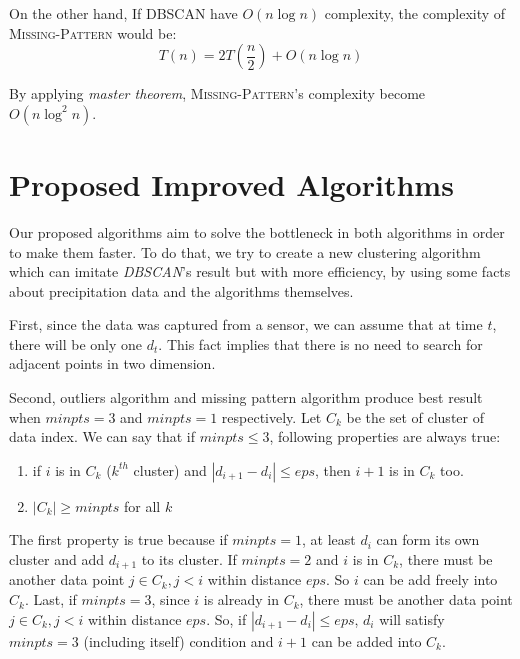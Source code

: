 \documentclass[conference]{IEEEtran}
\begin{document}
On the other hand, If \textsc{DBSCAN} have $O(n \log{n})$ complexity, the complexity of \textsc{Missing-Pattern} would be:
\[
T(n) = 2T(\frac{n}{2}) + O(n \log{n})
\]

By applying \textit{master theorem}, \textsc{Missing-Pattern}'s complexity become $O(n \log^2{n})$.


\section{Proposed Improved Algorithms}
Our proposed algorithms aim to solve the bottleneck in both algorithms in order to make them faster. To do that, we try to create a new clustering algorithm which can imitate \textit{DBSCAN}'s result but with more efficiency, by using some facts about precipitation data and the algorithms themselves.

First, since the data was captured from a sensor, we can assume that at time $t$, there will be only one $d_{t}$. This fact implies that there is no need to search for adjacent points in two dimension.

Second, outliers algorithm and missing pattern algorithm produce best result when $\textit{minpts} = 3$ and $\textit{minpts} = 1$ respectively. Let $C_{k}$ be the set of cluster of data index. We can say that if $\textit{minpts} \le 3$, following properties are always true:
\begin{enumerate}
	\item if $i$ is in $C_{k}$ (\textit{$k^{th}$} cluster) and $|d_{i+1} - d_{i}| \le \textit{eps}$, then $i+1$ is in $C_{k}$ too.
	\item $|C_{k}| \ge \textit{minpts}$ for all $k$ 
\end{enumerate}

The first property is true because if $\textit{minpts} = 1$, at least $d_{i}$ can form its own cluster and add $d_{i+1}$ to its cluster. If $\textit{minpts} = 2$ and $i$ is in $C_{k}$, there must be another data point $j \in C_{k}, j < i$ within distance $\textit{eps}$. So $i$ can be add freely into $C_{k}$. Last, if $\textit{minpts} = 3$, since $i$ is already in $C_{k}$, there must be another data point $j \in C_{k}, j < i$ within distance $\textit{eps}$. So, if $|d_{i+1} - d_{i}| \le \textit{eps}$, $d_{i}$ will satisfy $\textit{minpts} = 3$ (including itself) condition and $i+1$ can be added into $C_{k}$.
\end{document}
